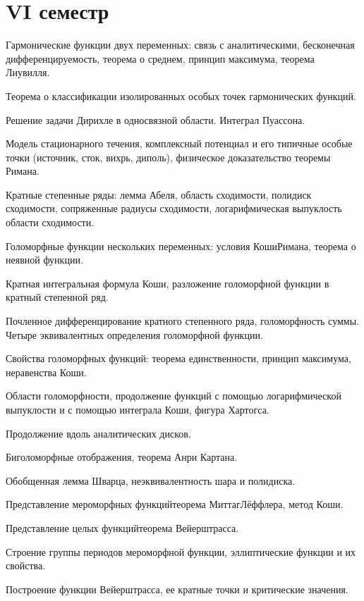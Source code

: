 \documentclass[a4paper]{article}
\begin{document}
\section*{VI семестр}
\begin{nums}{-2}
\item Гармонические функции двух переменных: связь с аналитическими, бесконечная дифференцируемость,
      теорема о среднем, принцип максимума, теорема Лиувилля.
\item Теорема о классификации изолированных особых точек гармонических функций.
\item Решение задачи Дирихле в односвязной области. Интеграл Пуассона.
\item Модель стационарного течения, комплексный потенциал и его типичные особые точки (источник,
      сток, вихрь, диполь), физическое доказательство теоремы Римана.
\item Кратные степенные ряды: лемма Абеля, область сходимости, полидиск сходимости, сопряженные
      радиусы сходимости, логарифмическая выпуклость области сходимости.
\item Голоморфные функции нескольких переменных: условия Коши\ч Римана,  теорема о неявной функции.
\item Кратная интегральная формула Коши, разложение голоморфной функции в кратный степенной ряд.
\item Почленное дифференцирование кратного степенного ряда, голоморфность суммы. Четыре эквивалентных
      определения голоморфной функции.
\item Свойства голоморфных функций: теорема единственности, принцип максимума, неравенства Коши.
\item Области голоморфности, продолжение функций с помощью логарифмической выпуклости и с помощью
      интеграла Коши, фигура Хартогса.
\item Продолжение вдоль аналитических дисков.
\item Биголоморфные отображения, теорема Анри Картана.
\item Обобщенная лемма Шварца,  неэквивалентность шара и полидиска.
\item Представление мероморфных функций\т теорема Миттаг\ч Лёффлера, метод Коши.
\item Представление целых функций\т теорема Вейерштрасса.
\item Строение группы периодов мероморфной функции, эллиптические функции и их свойства.
\item Построение функции Вейерштрасса, ее кратные точки и критические значения.

\end{nums}
\end{document}
